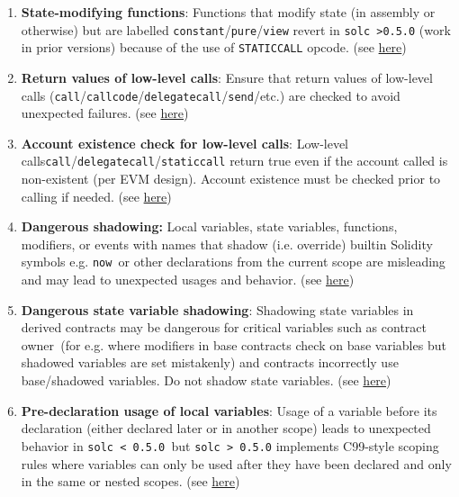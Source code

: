 \begin{enumerate}
\item\textbf{State-modifying functions}: Functions that modify state (in assembly or otherwise) but are labelled \verb|constant|/\verb|pure|/\verb|view| revert in \verb|solc >0.5.0| (work in prior versions) because of the use of \verb|STATICCALL| opcode. (see \href{https://github.com/crytic/slither/wiki/Detector-Documentation\#constant-functions-using-assembly-code}{here})

\item\textbf{Return values of low-level calls}: Ensure that return values of low-level calls (\verb|call|/\verb|callcode|/\verb|delegatecall|/\verb|send|/etc.) are checked to avoid unexpected failures. (see \href{https://swcregistry.io/docs/SWC-104}{here})

\item\textbf{Account existence check for low-level calls}: Low-level calls\linebreak\verb|call|/\verb|delegatecall|/\verb|staticcall| return true even if the account called is non-existent (per EVM design). Account existence must be checked prior to calling if needed. (see \href{https://github.com/crytic/slither/wiki/Detector-Documentation\#low-level-calls}{here})

\item\textbf{Dangerous shadowing: }Local variables, state variables, functions, modifiers, or events with names that shadow (i.e. override) builtin Solidity symbols e.g. \verb|now |or other declarations from the current scope are misleading and may lead to unexpected usages and behavior. (see \href{https://github.com/crytic/slither/wiki/Detector-Documentation\#builtin-symbol-shadowing}{here})

\item\textbf{Dangerous state variable shadowing}: Shadowing state variables in derived contracts may be dangerous for critical variables such as contract owner\verb| |(for e.g. where modifiers in base contracts check on base variables but shadowed variables are set mistakenly) and contracts incorrectly use base/shadowed variables. Do not shadow state variables. (see \href{https://swcregistry.io/docs/SWC-119}{here})

\item\textbf{Pre-declaration usage of local variables}: Usage of a variable before its declaration (either declared later or in another scope) leads to unexpected behavior in \verb|solc < 0.5.0 |but \verb|solc > 0.5.0| implements C99-style scoping rules where variables can only be used after they have been declared and only in the same or nested scopes. (see \href{https://github.com/crytic/slither/wiki/Detector-Documentation\#pre-declaration-usage-of-local-variables}{here})


\end{enumerate}

